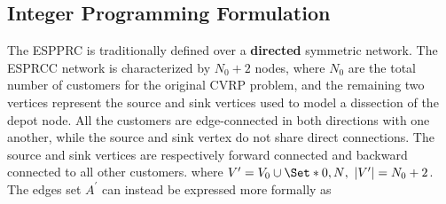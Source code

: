 \begin{comment}

[MY OWN STUFF, kept for reference purpose. TODO: Merge or delete later]
\subsection{Shortest Path Problem with Resource Constraints}
If there are no negative cost cyles, e.g. when the reduced cost variables are positive $\bar{c_{ij}} \ge 0$,
the ESPPRC problem is solvable in polynomial time, since the elementarity conditions are guaranteed
to be satisfied in this case.
In this particular case, some authors have proposed efficient methods to tackle this case:
\cite{beasley1989}, \cite{carlyle2008}, \cite{dumitrescu2003}, \cite{muhandiramge2009}.
These proposed approaches work under the assumption that no negative cost cycle is present,
and use lagrangian relaxation to relax the capacity constraints.

\subsection{Elementary Shortest Path Problem with Resource Constraints}
In the case where the network may be contain negative cost cycles, the
elementarity condition must be explicitly modeled, or relaxed, in order
to obtain reasonable dual bound solutions for the CVRP.
\textcite{feillet2004} proposes a dynamic programming algorithm where
the elementary property is handled through the usage of an additional resource
bound to each node.
\textcite{righini2006} proposes a bi-directional dynamic programming algorithm to solve the ESPPRC.
\end{comment}

\subsection{Integer Programming Formulation}
\label{sec:espprc-integer-programming-formulation}
The ESPPRC is traditionally defined over a \textbf{directed}
symmetric network.
The ESPRCC network is characterized by $N_0 + 2$ nodes,
where $N_0$ are the total number of customers for the original CVRP problem,
and the remaining two vertices represent the source and sink vertices used to
model a dissection of the depot node.
All the customers are edge-connected in both directions with one another,
while the source and sink vertex do not share direct connections.
The source and sink vertices are respectively forward connected and backward connected to all other customers.
where $V^\prime = V_0 \cup \Set*{0, N},\ |V^\prime| = N_0 + 2$.
The edges set $A^\prime$ can instead be expressed more formally as

